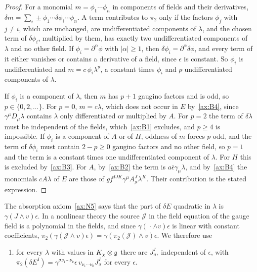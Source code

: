 \begin{proof}
For a monomial $m=\phi_1\cdots\phi_n$ in components of fields and their derivatives, $\delta m=\sum_i\pm\phi_1\cdots\delta\phi_i\cdots\phi_n$. A term contributes to $\pi_2$ only if the factors $\phi_j$ with $j\ne i$, which are unchanged, are undifferentiated components of $\lambda$, and the chosen term of $\delta\phi_i$, multiplied by them, has exactly two undifferentiated components of $\lambda$ and no other field. If $\phi_i=\partial^\alpha\phi$ with $|\alpha|\ge1$, then $\delta\phi_i=\partial^\alpha\delta\phi$, and every term of it either vanishes or contains a derivative of a field, since $\epsilon$ is constant. So $\phi_i$ is undifferentiated and $m=c\,\phi_i\lambda^p$, a constant times $\phi_i$ and $p$ undifferentiated components of $\lambda$.

If $\phi_i$ is a component of $\lambda$, then $m$ has $p+1$ gaugino factors and is odd, so $p\in\{0,2,\dots\}$. For $p=0$, $m=c\lambda$, which does not occur in $E$ by~\ref{ax:B4}, since $\gamma^\mu D_\mu\lambda$ contains $\lambda$ only differentiated or multiplied by $A$. For $p=2$ the term of $\delta\lambda$ must be independent of the fields, which~\ref{ax:B1} excludes, and $p\ge4$ is impossible. If $\phi_i$ is a component of $A$ or of $H$, oddness of $m$ forces $p$ odd, and the term of $\delta\phi_i$ must contain $2-p\ge0$ gaugino factors and no other field, so $p=1$ and the term is a constant times one undifferentiated component of $\lambda$. For $H$ this is excluded by~\ref{ax:B3}. For $A$, by~\ref{ax:B2} the term is $a\bar\epsilon\gamma_\mu\lambda$, and by~\ref{ax:B4} the monomials $cA\lambda$ of $E$ are those of $g f^{IJK}\gamma^\mu A^J_\mu\lambda^K$. Their contribution is the stated expression.
\end{proof}

The absorption axiom~\ref{ax:N5} says that the part of $\delta E$ quadratic in $\lambda$ is $\gamma(J\wedge v)\epsilon$. In a nonlinear theory the source $\mathcal J$ in the field equation of the gauge field is a polynomial in the fields, and since $\gamma(\,\cdot\wedge v)\epsilon$ is linear with constant coefficients, $\pi_2(\gamma(\mathcal J\wedge v)\epsilon)=\gamma(\pi_2(\mathcal J)\wedge v)\epsilon$. We therefore use
\begin{enumerate}[label=(N5$_\pi$)]
\item\label{ax:N5pi} for every $\lambda$ with values in $K_\chi\otimes\mathfrak{g}$ there are $J^I_\sigma$, independent of $\epsilon$, with $\pi_2(\delta E^I)=\gamma^{\sigma\nu_1\cdots\nu_k}\epsilon\,v_{\nu_1\cdots\nu_k}J^I_\sigma$ for every $\epsilon$.
\end{enumerate}

